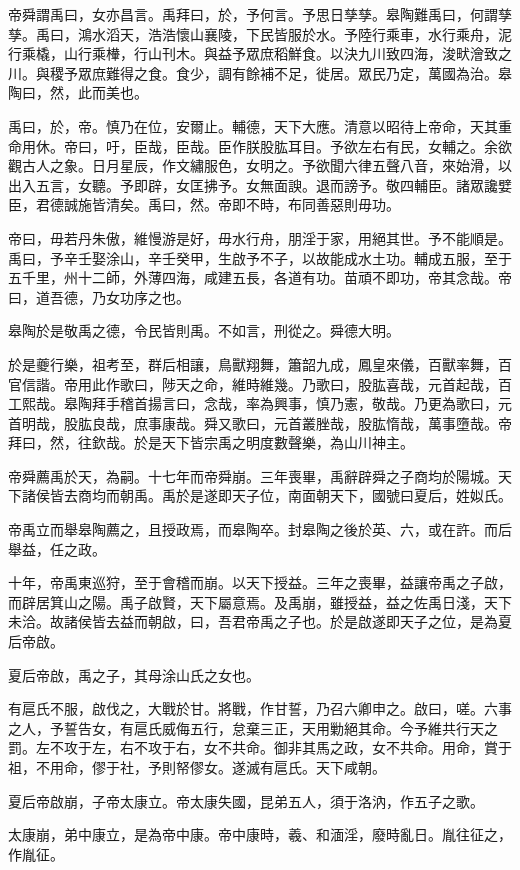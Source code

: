 帝舜謂禹曰，女亦昌言。禹拜曰，於，予何言。予思日孳孳。皋陶難禹曰，何謂孳孳。禹曰，鴻水滔天，浩浩懷山襄陵，下民皆服於水。予陸行乘車，水行乘舟，泥行乘橇，山行乘檋，行山刊木。與益予眾庶稻鮮食。以決九川致四海，浚畎澮致之川。與稷予眾庶難得之食。食少，調有餘補不足，徙居。眾民乃定，萬國為治。皋陶曰，然，此而美也。

禹曰，於，帝。慎乃在位，安爾止。輔德，天下大應。清意以昭待上帝命，天其重命用休。帝曰，吁，臣哉，臣哉。臣作朕股肱耳目。予欲左右有民，女輔之。余欲觀古人之象。日月星辰，作文繡服色，女明之。予欲聞六律五聲八音，來始滑，以出入五言，女聽。予即辟，女匡拂予。女無面諛。退而謗予。敬四輔臣。諸眾讒嬖臣，君德誠施皆清矣。禹曰，然。帝即不時，布同善惡則毋功。

帝曰，毋若丹朱傲，維慢游是好，毋水行舟，朋淫于家，用絕其世。予不能順是。禹曰，予辛壬娶涂山，辛壬癸甲，生啟予不子，以故能成水土功。輔成五服，至于五千里，州十二師，外薄四海，咸建五長，各道有功。苗頑不即功，帝其念哉。帝曰，道吾德，乃女功序之也。

皋陶於是敬禹之德，令民皆則禹。不如言，刑從之。舜德大明。

於是夔行樂，祖考至，群后相讓，鳥獸翔舞，簫韶九成，鳳皇來儀，百獸率舞，百官信諧。帝用此作歌曰，陟天之命，維時維幾。乃歌曰，股肱喜哉，元首起哉，百工熙哉。皋陶拜手稽首揚言曰，念哉，率為興事，慎乃憲，敬哉。乃更為歌曰，元首明哉，股肱良哉，庶事康哉。舜又歌曰，元首叢脞哉，股肱惰哉，萬事墮哉。帝拜曰，然，往欽哉。於是天下皆宗禹之明度數聲樂，為山川神主。

帝舜薦禹於天，為嗣。十七年而帝舜崩。三年喪畢，禹辭辟舜之子商均於陽城。天下諸侯皆去商均而朝禹。禹於是遂即天子位，南面朝天下，國號曰夏后，姓姒氏。

帝禹立而舉皋陶薦之，且授政焉，而皋陶卒。封皋陶之後於英、六，或在許。而后舉益，任之政。

十年，帝禹東巡狩，至于會稽而崩。以天下授益。三年之喪畢，益讓帝禹之子啟，而辟居箕山之陽。禹子啟賢，天下屬意焉。及禹崩，雖授益，益之佐禹日淺，天下未洽。故諸侯皆去益而朝啟，曰，吾君帝禹之子也。於是啟遂即天子之位，是為夏后帝啟。

夏后帝啟，禹之子，其母涂山氏之女也。

有扈氏不服，啟伐之，大戰於甘。將戰，作甘誓，乃召六卿申之。啟曰，嗟。六事之人，予誓告女，有扈氏威侮五行，怠棄三正，天用勦絕其命。今予維共行天之罰。左不攻于左，右不攻于右，女不共命。御非其馬之政，女不共命。用命，賞于祖，不用命，僇于社，予則帑僇女。遂滅有扈氏。天下咸朝。

夏后帝啟崩，子帝太康立。帝太康失國，昆弟五人，須于洛汭，作五子之歌。

太康崩，弟中康立，是為帝中康。帝中康時，羲、和湎淫，廢時亂日。胤往征之，作胤征。

